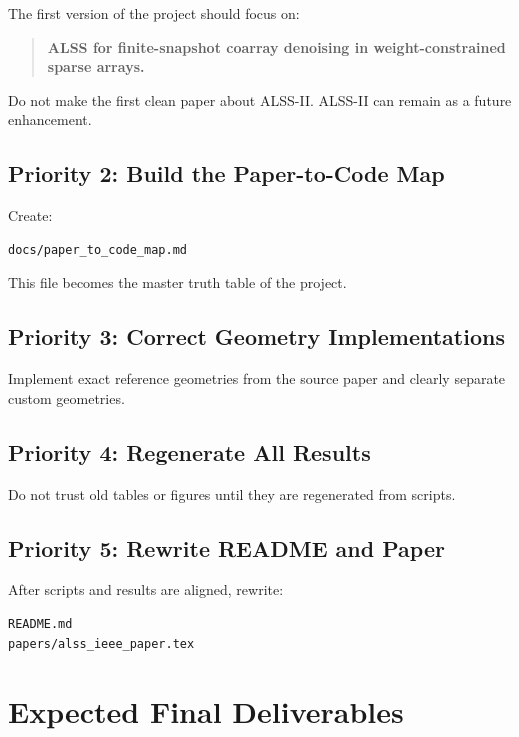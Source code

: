 \documentclass[11pt,letterpaper]{article}
\begin{document}
The first version of the project should focus on:
\begin{quote}
\textbf{ALSS for finite-snapshot coarray denoising in weight-constrained sparse arrays.}
\end{quote}

Do not make the first clean paper about ALSS-II. ALSS-II can remain as a future enhancement.

\subsection{Priority 2: Build the Paper-to-Code Map}

Create:
\begin{lstlisting}
docs/paper_to_code_map.md
\end{lstlisting}

This file becomes the master truth table of the project.

\subsection{Priority 3: Correct Geometry Implementations}

Implement exact reference geometries from the source paper and clearly separate custom geometries.

\subsection{Priority 4: Regenerate All Results}

Do not trust old tables or figures until they are regenerated from scripts.

\subsection{Priority 5: Rewrite README and Paper}

After scripts and results are aligned, rewrite:
\begin{lstlisting}
README.md
papers/alss_ieee_paper.tex
\end{lstlisting}

\section{Expected Final Deliverables}
\end{document}
